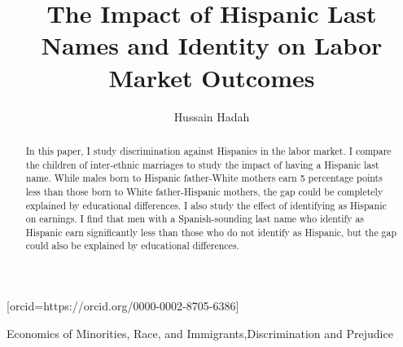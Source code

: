 \documentclass[a4paper,fleqn]{cas-sc}
\begin{document}
\let\WriteBookmarks\relax
\def\floatpagepagefraction{1}
\def\textpagefraction{.001}



\title [mode = title]{The Impact of Hispanic Last Names and Identity on Labor Market Outcomes}

\author[]{Hussain Hadah}[orcid=https://orcid.org/0000-0002-8705-6386]


\begin{abstract}
In this paper, I study discrimination against Hispanics in the labor market. I compare the children of inter-ethnic marriages to study the impact of having a Hispanic last name. While males born to Hispanic father-White mothers earn 5 percentage points less than those born to White father-Hispanic mothers, the gap could be completely explained by educational differences. I also study the effect of identifying as Hispanic on earnings. I find that men with a Spanish-sounding last name who identify as Hispanic earn significantly less than those who do not identify as Hispanic, but the gap could also be explained by educational differences.
\end{abstract}

\begin{keywords}
Economics of Minorities, Race, and Immigrants\sep Discrimination and Prejudice\\
\end{keywords}

\maketitle
\end{document}
